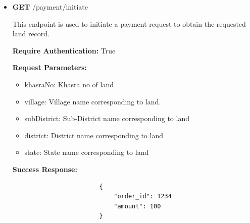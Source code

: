 \documentclass[12pt]{article}
\begin{document}
\begin{itemize}
            \item \textbf{GET}  /payment/initiate
                \begin{addmargin}[1em]{2em}%
                    This endpoint is used to initiate a payment request to obtain the requested land record.
                    \par\textbf{Require Authentication:} True
                    \par\textbf{Request Parameters:}
                    \begin{itemize}
                        \item khasraNo: Khasra no of land
                        \item village: Village name corresponding to land.
                        \item subDistrict: Sub-District name corresponding to land
                        \item district: District name corresponding to land
                        \item state: State name corresponding to land
                    \end{itemize}
                    \par\textbf{Success Response:}
                    \begin{listing}[H]
                    \begin{verbatim}
                        {   
                            "order_id": 1234
                            "amount": 100
                        }
                    \end{verbatim}
                   \end{listing}
                \end{addmargin}


\end{itemize}
\end{document}
